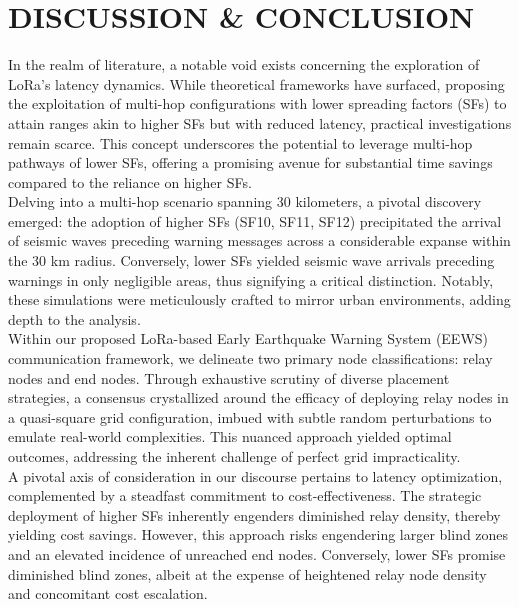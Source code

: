 \chapter{DISCUSSION \& CONCLUSION}

\hspace{12pt}In the realm of literature, a notable void exists concerning the exploration of LoRa's latency dynamics. While theoretical frameworks have surfaced, proposing the exploitation of multi-hop configurations with lower spreading factors (SFs) to attain ranges akin to higher SFs but with reduced latency, practical investigations remain scarce. This concept underscores the potential to leverage multi-hop pathways of lower SFs, offering a promising avenue for substantial time savings compared to the reliance on higher SFs.\\

Delving into a multi-hop scenario spanning 30 kilometers, a pivotal discovery emerged: the adoption of higher SFs (SF10, SF11, SF12) precipitated the arrival of seismic waves preceding warning messages across a considerable expanse within the 30 km radius. Conversely, lower SFs yielded seismic wave arrivals preceding warnings in only negligible areas, thus signifying a critical distinction. Notably, these simulations were meticulously crafted to mirror urban environments, adding depth to the analysis.\\

Within our proposed LoRa-based Early Earthquake Warning System (EEWS) communication framework, we delineate two primary node classifications: relay nodes and end nodes. Through exhaustive scrutiny of diverse placement strategies, a consensus crystallized around the efficacy of deploying relay nodes in a quasi-square grid configuration, imbued with subtle random perturbations to emulate real-world complexities. This nuanced approach yielded optimal outcomes, addressing the inherent challenge of perfect grid impracticality.\\

A pivotal axis of consideration in our discourse pertains to latency optimization, complemented by a steadfast commitment to cost-effectiveness. The strategic deployment of higher SFs inherently engenders diminished relay density, thereby yielding cost savings. However, this approach risks engendering larger blind zones and an elevated incidence of unreached end nodes. Conversely, lower SFs promise diminished blind zones, albeit at the expense of heightened relay node density and concomitant cost escalation.\\

